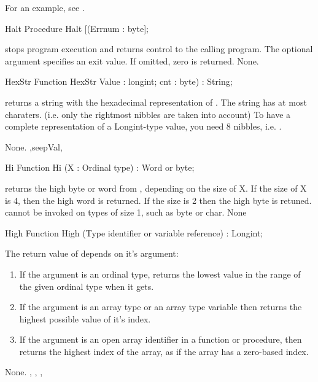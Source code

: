 \documentclass{report}
\begin{document}
For an example, see .
\begin{procedure}{Halt}
\Declaration
Procedure Halt [(Errnum : byte];

\Description
{} stops program execution and returns control to the calling
program. The optional argument  specifies an exit value. If
omitted, zero is returned.
\Errors
None.
\SeeAlso
{}
\end{procedure}
\html{}
\begin{function}{HexStr}
\Declaration
Function HexStr Value : longint; cnt : byte) : String;

\Description
{} returns a string with the hexadecimal representation
of . The string has at most  charaters.
 (i.e. only the  rightmost nibbles are taken into account)
To have a complete representation of a Longint-type value, you need 8
nibbles, i.e. .

\Errors
None.
\SeeAlso
{},seep{Val},
\end{function}
\html{}
\begin{function}{Hi}
\Declaration
Function Hi (X : Ordinal type) : Word or byte;

\Description
{} returns the high byte or word from , depending on the size
of X. If the size of X is 4, then the high word is returned. If the size is
2 then the high byte is retuned. 
 cannot be invoked on types of size 1, such as byte or char.
\Errors
None
\SeeAlso
{}
\end{function}
\html{}
\begin{function}{High}
\Declaration
Function High (Type identifier or variable reference) : Longint;

\Description
 The return value of  depends on it's argument:
\begin{enumerate}
\item If the argument is an ordinal type,  returns the lowest value in the range of the given ordinal 
type when it gets.
\item If the argument is an array type or an array type variable then 
 returns the highest possible value of it's index.
\item If the argument is an open array identifier in a function or
procedure, then  returns the highest index of the array, as if the
array has a zero-based index.
\end{enumerate}

\Errors
None.
\SeeAlso
{}, , , 
\end{function}
\end{document}
